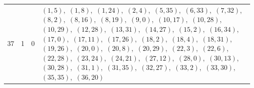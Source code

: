 \documentclass[11pt]{article}
\begin{document}
\begin{longtable}{@{}rrl>{\raggedright\arraybackslash}p{}@{}}
37 & 1 & $0$ & $(1,5)$,\allowbreak\ $(1,8)$,\allowbreak\ $(1,24)$,\allowbreak\ $(2,4)$,\allowbreak\ $(5,35)$,\allowbreak\ $(6,33)$,\allowbreak\ $(7,32)$,\allowbreak\ $(8,2)$,\allowbreak\ $(8,16)$,\allowbreak\ $(8,19)$,\allowbreak\ $(9,0)$,\allowbreak\ $(10,17)$,\allowbreak\ $(10,28)$,\allowbreak\ $(10,29)$,\allowbreak\ $(12,28)$,\allowbreak\ $(13,31)$,\allowbreak\ $(14,27)$,\allowbreak\ $(15,2)$,\allowbreak\ $(16,34)$,\allowbreak\ $(17,0)$,\allowbreak\ $(17,11)$,\allowbreak\ $(17,26)$,\allowbreak\ $(18,2)$,\allowbreak\ $(18,4)$,\allowbreak\ $(18,31)$,\allowbreak\ $(19,26)$,\allowbreak\ $(20,0)$,\allowbreak\ $(20,8)$,\allowbreak\ $(20,29)$,\allowbreak\ $(22,3)$,\allowbreak\ $(22,6)$,\allowbreak\ $(22,28)$,\allowbreak\ $(23,24)$,\allowbreak\ $(24,21)$,\allowbreak\ $(27,12)$,\allowbreak\ $(28,0)$,\allowbreak\ $(30,13)$,\allowbreak\ $(30,28)$,\allowbreak\ $(31,1)$,\allowbreak\ $(31,35)$,\allowbreak\ $(32,27)$,\allowbreak\ $(33,2)$,\allowbreak\ $(33,30)$,\allowbreak\ $(35,35)$,\allowbreak\ $(36,20)$\\

\end{longtable}
\end{document}

